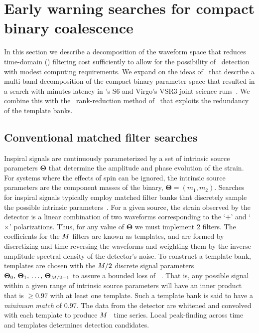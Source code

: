 \section{Early warning searches for compact binary coalescence}
\label{sec:method}

In this section we describe a decomposition of the \CBC{} waveform space that
reduces time-domain (\TD) filtering cost sufficiently to allow for the
possibility of \earlywarning\ detection with modest computing requirements.  We
expand on the ideas of~\citep{Marion2004, Buskulic2010} that describe a
multi-band decomposition of the compact binary parameter space that resulted in
a search with minutes latency in \LIGO{}'s S6 and Virgo's VSR3 joint science
runs~\citep{HugheyGWPAW2011}.  We combine this with the \SVD\ rank-reduction
method of~\citep{Cannon:2010p10398} that exploits the redundancy of
the template banks.

\subsection{Conventional \CBC{} matched filter searches}

Inspiral signals are continuously parameterized by a set of intrinsic source
parameters $\mathbf\Theta$ that determine the amplitude and phase evolution of the
\GW{} strain. For systems where the effects of spin can be
ignored, the intrinsic source parameters are the component masses of the
binary, $\mathbf\Theta = (m_1, m_2)$. Searches for inspiral signals typically
employ matched filter banks that discretely sample the possible intrinsic
parameters~\citep{findchirppaper}.  For a given source, the strain observed by
the detector is a linear combination of two waveforms corresponding to the
`$+$' and `$\times$' \GW{} polarizations.  Thus, for any value of
$\mathbf\Theta$ we must implement 2 filters.  The coefficients for the $M$ filters
are known as templates, and are formed by discretizing and time reversing the
waveforms and weighting them by the inverse amplitude spectral density of the
detector's noise. To construct a template bank, templates are chosen with the
$M/2$ discrete signal parameters $\mathbf\Theta_0,\, \mathbf\Theta_1,\, \dots,\,
\mathbf\Theta_{M/2-1}$ to assure a bounded loss of \SNR~\citep{Owen:1998dk}. That
is, any possible signal within a given range of intrinsic
source parameters will have an inner product that is $\geqslant 0.97$ with at
least one template. Such a template bank is said to have a {\em minimum match}
of 0.97. The data from the detector are whitened and convolved with each
template to produce $M$ \SNR\ time series. Local peak-finding across time and
templates determines detection candidates.

